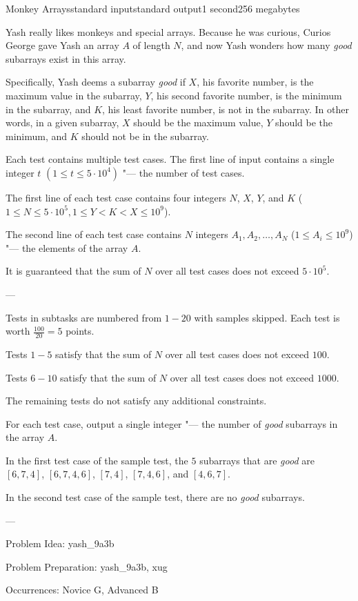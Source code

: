 \begin{problem}{Monkey Arrays}{standard input}{standard output}{1 second}{256 megabytes}

Yash really likes monkeys and special arrays. Because he was curious, Curios George gave Yash an array $A$ of length $N$, and now Yash wonders how many \textit{good} subarrays exist in this array.

Specifically, Yash deems a subarray \textit{good} if $X$, his favorite number, is the maximum value in the subarray, $Y$, his second favorite number, is the minimum in the subarray, and $K$, his least favorite number, is not in the subarray. In other words, in a given subarray, $X$ should be the maximum value, $Y$ should be the minimum, and $K$ should not be in the subarray.

\InputFile
Each test contains multiple test cases. The first line of input contains a single integer $t$ $(1 \leq t \leq 5 \cdot 10^4)$ "--- the number of test cases.

The first line of each test case contains four integers $N$, $X$, $Y$, and $K$ ($1 \le N \le 5 \cdot 10^5, 1 \le Y < K < X \le 10^9$).

The second line of each test case contains $N$ integers $A_1,A_2,\ldots,A_N$ ($1 \le A_i \le 10^9$) "--- the elements of the array $A$.

It is guaranteed that the sum of $N$ over all test cases does not exceed $5 \cdot 10^5$.

---

Tests in subtasks are numbered from $1-20$ with samples skipped. Each test is worth $\frac{100}{20}=5$ points.

Tests $1-5$ satisfy that the sum of $N$ over all test cases does not exceed $100$.

Tests $6-10$ satisfy that the sum of $N$ over all test cases does not exceed $1000$.

The remaining tests do not satisfy any additional constraints.

\OutputFile
For each test case, output a single integer "--- the number of \textit{good} subarrays in the array $A$.

\Example

\begin{example}
%
\end{example}

\Note
In the first test case of the sample test, the $5$ subarrays that are \textit{good} are $[6, 7, 4]$, $[6, 7, 4, 6]$, $[7, 4]$, $[7, 4, 6]$, and $[4, 6, 7]$.

In the second test case of the sample test, there are no \textit{good} subarrays.

---

Problem Idea: yash_9a3b

Problem Preparation: yash_9a3b, xug

Occurrences: Novice G, Advanced B

\end{problem}


